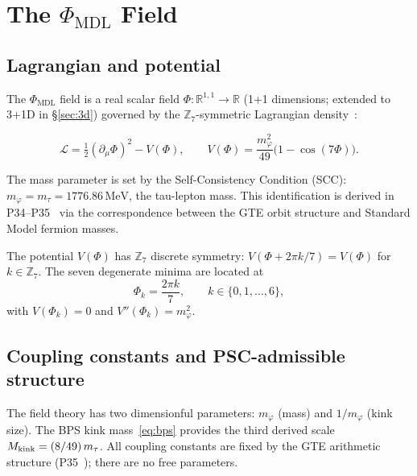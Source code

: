 \documentclass[11pt]{article}
\theoremstyle{remark}
\newcommand{\PHIMDL}{\Phi_{\mathrm{MDL}}}
\newcommand{\ZS}{\mathbb{Z}_7}
\newcommand{\Mkink}{M_{\rm kink}}
\newcommand{\mtau}{m_\tau}
\begin{document}
\section{The $\PHIMDL$ Field}
\label{sec:field}

\subsection{Lagrangian and potential}
\label{ssec:lagrangian}

The $\PHIMDL$ field is a real scalar field $\Phi:\mathbb{R}^{1,1}\to\mathbb{R}$
(1+1 dimensions; extended to 3+1D in \S\ref{sec:3d}) governed by the
$\ZS$-symmetric Lagrangian density~\cite{SpivackGTEMobius,SpivackGTEUnification}:

\begin{equation}
  \mathcal{L} = \tfrac{1}{2}(\partial_\mu\Phi)^2 - V(\Phi),
  \qquad
  V(\Phi) = \frac{m_\varphi^2}{49}\bigl(1 - \cos(7\Phi)\bigr).
  \label{eq:lagrangian}
\end{equation}

The mass parameter is set by the Self-Consistency Condition (SCC): $m_\varphi = \mtau = 1776.86\,\mathrm{MeV}$, the tau-lepton mass.  This identification is derived in P34--P35~\cite{SpivackGTEMobius,SpivackGTEUnification} via the correspondence between the GTE orbit structure and Standard Model fermion masses.

The potential $V(\Phi)$ has $\ZS$ discrete symmetry: $V(\Phi + 2\pi k/7) = V(\Phi)$ for $k\in\ZS$.  The seven degenerate minima are located at
\begin{equation}
  \Phi_k = \frac{2\pi k}{7}, \qquad k\in\{0,1,\ldots,6\},
  \label{eq:vacua}
\end{equation}
with $V(\Phi_k) = 0$ and $V''(\Phi_k) = m_\varphi^2$.

\subsection{Coupling constants and PSC-admissible structure}
\label{ssec:coupling}

The field theory has two dimensionful parameters: $m_\varphi$ (mass) and $1/m_\varphi$ (kink size).  The BPS kink mass~\eqref{eq:bps} provides the third derived scale $\Mkink = (8/49)\,\mtau$.  All coupling constants are fixed by the GTE arithmetic structure (P35~\cite{SpivackGTEUnification}); there are no free parameters.
\end{document}
